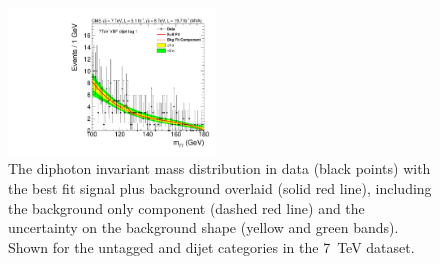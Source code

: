 \begin{figure}
  \includegraphics[width=0.49\textwidth]{results/plots/mgg-cats/mgg_mva_nosub_ch1_cat5_7TeV.pdf}
  \caption[The diphoton invariant mass distribution in data with the best fit signal plus background overlaid for the untagged and dijet tagged categories in the 8~TeV dataset]{The diphoton invariant mass distribution in data (black points) with the best fit signal plus background overlaid (solid red line), including the background only component (dashed red line) and the uncertainty on the background shape (yellow and green bands). Shown for the untagged and dijet categories in the 7~TeV dataset.}
  \label{fig:bfres1}
\end{figure}

